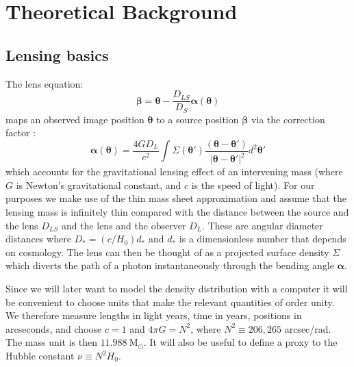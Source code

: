 \documentclass[galley,usenatbib]{mn2e}
\newcommand{\Msun}{\ensuremath{\mathrm{M}_\odot}}
\renewcommand{\vec}[1]{\ensuremath{\boldsymbol{#1}}}
\begin{document}
\section{Theoretical Background}\label{sec:theory} %

\subsection{Lensing basics}\label{sec:lensing_basic} %

The lens equation:
%
\begin{equation}
\vec\beta = \vec\theta - \frac{D_{LS}}{D_S}\vec\alpha(\vec\theta)
\label{eqn:lens_equation}
\end{equation}
%
maps an observed image position $\vec\theta$ to a source position $\vec\beta$
via the correction factor \citep[e.g.][]{1992grle.book.....S}:
%
\begin{equation}
\vec\alpha(\vec\theta) = \frac{4GD_L}{c^2} \int \Sigma(\vec\theta')\frac{(\vec\theta - \vec\theta')}{\ |\vec\theta - \vec\theta'|^2}d^2\vec\theta'
\end{equation}
%
which accounts for the gravitational lensing effect of an intervening mass
(where $G$ is Newton's gravitational constant, and $c$ is the speed of light).
For our purposes we make use of the thin mass sheet approximation and assume
that the lensing mass is infinitely thin compared with the distance between the
source and the lens $D_{LS}$ and the lens and the observer $D_{L}$. These are
angular diameter distances where $D_* = (c/H_0)d_*$ and $d_*$ is a
dimensionless number that depends on cosmology.  The lens can then be thought
of as a projected surface density $\Sigma$ which diverts the path of a photon
instantaneously through the bending angle $\vec\alpha$.

Since we will later want to model the density distribution with a computer it
will be convenient to choose units that make the relevant quantities of order
unity.  We therefore measure lengths in light years, time in years, positions
in arcseconds, and choose $c=1$ and $4\pi G = N^2$, where $N^2 \equiv 206,265$
arcsec/rad. The mass unit is then $11.988\ \Msun$. It will also be useful to
define a proxy to the Hubble constant $\nu \equiv N^2 H_0$.
\end{document}
